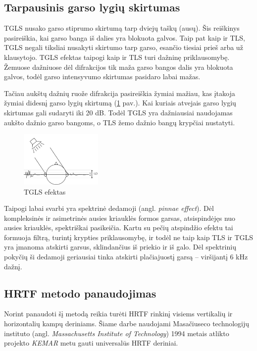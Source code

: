 \documentclass[]{vgtuef}
\begin{document}
\subsection{Tarpausinis garso lygių skirtumas}
TGLS nusako garso stiprumo skirtumą tarp dviejų taškų (ausų). Šis reiškinys pasireiškia, kai garso banga iš dalies yra blokuota galvos. Taip pat kaip ir TLS, TGLS negali tiksliai nusakyti skirtumo tarp garso, esančio tiesiai prieš arba už klausytojo. TGLS efektas taipogi kaip ir TLS turi dažninę priklausomybę. Žemuose dažniuose dėl difrakcijos tik maža garso bangos dalis yra blokuota galvos, todėl garso intensyvumo skirtumas pasidaro labai mažas.

Tačiau aukštų dažnių ruože difrakcija pasireiškia žymiai mažiau, kas įtakoja žymiai didesnį garso lygių skirtumą (\ref{fig:ILD_1} pav.). Kai kuriais atvejais garso lygių skirtumas gali sudaryti iki 20 dB. Todėl TGLS yra dažniausiai naudojamas aukšto dažnio garso bangoms, o TLS žemo dažnio bangų krypčiai nustatyti. 

\begin{figure}[!ht]
  \centering
  \includegraphics[width=150px]{img/ILD.jpg}
  \caption{TGLS efektas}
  \label{fig:ILD_1}
\end{figure}

Taipogi labai svarbi yra spektrinė dedamoji (angl. \textit{pinnae effect}). Dėl kompleksinės ir asimetrinės ausies kriauklės formos garsas, atsispindėjęs nuo ausies kriauklės, spektriškai pasikeičia.  Kartu su pečių atspindžio efektu tai formuoja filtrą, turintį krypties priklausomybę, ir todėl ne taip kaip TLS ir TGLS yra įmanoma atskirti garsus, sklindančius iš priekio ir iš galo. Dėl spektrinių pokyčių ši dedamoji geriausiai tinka atskirti plačiajuostį garsą -- viršijantį 6 kHz dažnį.


\subsection{HRTF metodo panaudojimas}

Norint panaudoti šį metodą reikia turėti HRTF rinkinį visiems vertikalių ir horizontalių kampų deriniams. Šiame darbe naudojami Masačiuseco technologijų instituto (angl. \textit{Massachusetts Institute of Technology}) 1994 metais atlikto projekto \textit{KEMAR} metu gauti universalūs HRTF deriniai.
\end{document}
